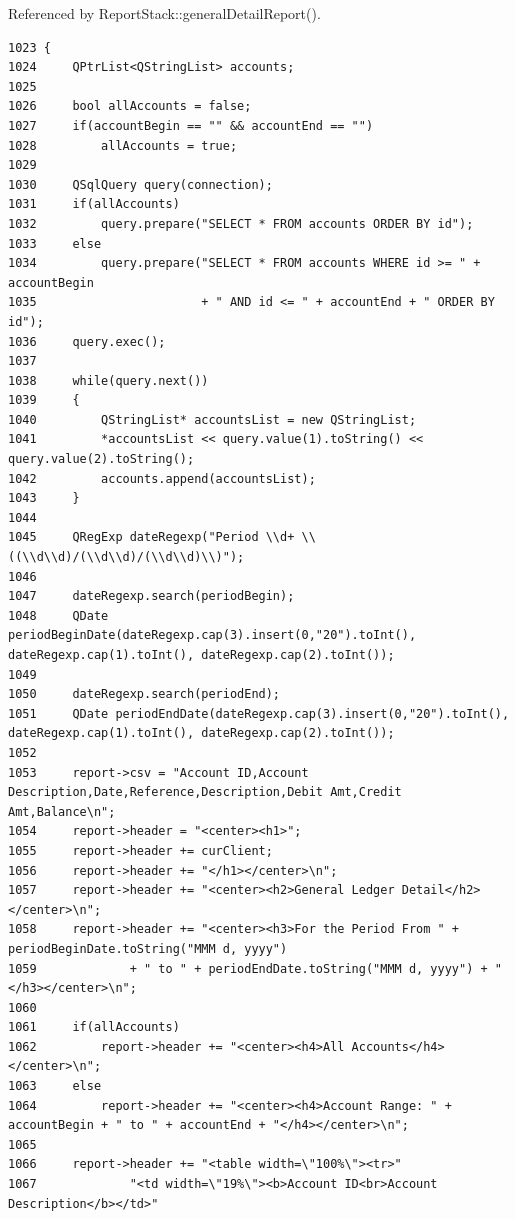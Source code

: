 Referenced by Report\-Stack::general\-Detail\-Report().

\footnotesize\begin{verbatim}1023 {
1024     QPtrList<QStringList> accounts;
1025     
1026     bool allAccounts = false;
1027     if(accountBegin == "" && accountEnd == "")
1028         allAccounts = true;
1029     
1030     QSqlQuery query(connection);
1031     if(allAccounts)
1032         query.prepare("SELECT * FROM accounts ORDER BY id");
1033     else
1034         query.prepare("SELECT * FROM accounts WHERE id >= " + accountBegin
1035                       + " AND id <= " + accountEnd + " ORDER BY id");
1036     query.exec();
1037 
1038     while(query.next())
1039     {
1040         QStringList* accountsList = new QStringList;
1041         *accountsList << query.value(1).toString() << query.value(2).toString();
1042         accounts.append(accountsList);
1043     }
1044     
1045     QRegExp dateRegexp("Period \\d+ \\((\\d\\d)/(\\d\\d)/(\\d\\d)\\)");
1046     
1047     dateRegexp.search(periodBegin);
1048     QDate periodBeginDate(dateRegexp.cap(3).insert(0,"20").toInt(), dateRegexp.cap(1).toInt(), dateRegexp.cap(2).toInt());
1049     
1050     dateRegexp.search(periodEnd);
1051     QDate periodEndDate(dateRegexp.cap(3).insert(0,"20").toInt(), dateRegexp.cap(1).toInt(), dateRegexp.cap(2).toInt());
1052     
1053     report->csv = "Account ID,Account Description,Date,Reference,Description,Debit Amt,Credit Amt,Balance\n";
1054     report->header = "<center><h1>";
1055     report->header += curClient;
1056     report->header += "</h1></center>\n";
1057     report->header += "<center><h2>General Ledger Detail</h2></center>\n";
1058     report->header += "<center><h3>For the Period From " + periodBeginDate.toString("MMM d, yyyy")
1059             + " to " + periodEndDate.toString("MMM d, yyyy") + "</h3></center>\n";
1060     
1061     if(allAccounts)
1062         report->header += "<center><h4>All Accounts</h4></center>\n";
1063     else
1064         report->header += "<center><h4>Account Range: " + accountBegin + " to " + accountEnd + "</h4></center>\n";
1065     
1066     report->header += "<table width=\"100%\"><tr>"
1067             "<td width=\"19%\"><b>Account ID<br>Account Description</b></td>"

\end{verbatim}
